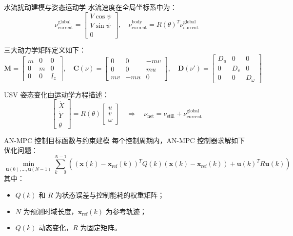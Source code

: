\begin{frame}{水流扰动建模与姿态运动学}
\scriptsize
\justifying
水流速度在全局坐标系中为：
\[
\nu_{\text{current}}^{\text{global}} = 
\begin{bmatrix}
V \cos \psi \\ V \sin \psi \\ 0
\end{bmatrix}, \quad
\nu_{\text{current}}^{\text{body}} = R(\theta)^T \nu_{\text{current}}^{\text{global}}
\]

\vspace{0.5em}
三大动力学矩阵定义如下：
\[
\boldsymbol{M} =
\begin{bmatrix}
m & 0 & 0 \\
0 & m & 0 \\
0 & 0 & I_z
\end{bmatrix}, \quad
\boldsymbol{C}(\nu) =
\begin{bmatrix}
0 & 0 & -mv \\
0 & 0 & mu \\
mv & -mu & 0
\end{bmatrix}, \quad
\boldsymbol{D}(\nu') =
\begin{bmatrix}
D_u & 0 & 0 \\
0 & D_v & 0 \\
0 & 0 & D_\omega
\end{bmatrix}
\]

\vspace{0.5em}
USV 姿态变化由运动学方程描述：
\[
\begin{bmatrix}
\dot{X} \\ \dot{Y} \\ \dot{\theta}
\end{bmatrix}
= R(\theta)
\begin{bmatrix} u \\ v \\ \omega \end{bmatrix}
\quad \Rightarrow \quad
\nu_{\text{net}} = \nu_{\text{still}} + \nu_{\text{current}}^{\text{global}}
\]
\end{frame}

\begin{frame}{AN-MPC 控制目标函数与约束建模}
\justifying
每个控制周期内，AN-MPC 控制器求解如下优化问题：
\[
\min_{\boldsymbol{u}(0),\dots,\boldsymbol{u}(N-1)} \sum_{k=0}^{N-1} \left( (\boldsymbol{x}(k) - \boldsymbol{x}_{\text{ref}}(k))^T Q(k)(\boldsymbol{x}(k) - \boldsymbol{x}_{\text{ref}}(k)) + \boldsymbol{u}(k)^T R \boldsymbol{u}(k) \right)
\]
其中：
\begin{itemize}
    \item $Q(k)$ 和 $R$ 为状态误差与控制能耗的权重矩阵；
    \item $N$ 为预测时域长度，$\boldsymbol{x}_{\text{ref}}(k)$ 为参考轨迹；
    \item $Q(k)$ 动态变化，$R$ 为固定矩阵。
\end{itemize}
\end{frame}

